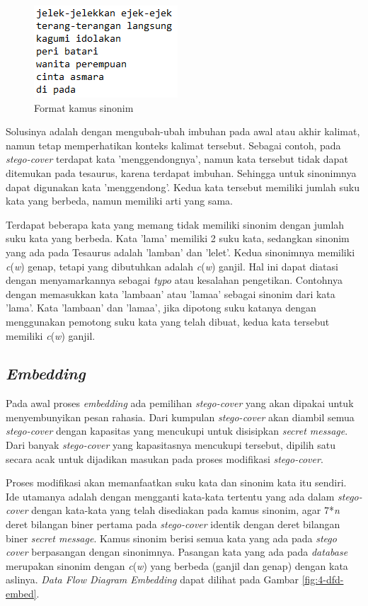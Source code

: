 \begin{figure}[H]
	\centering
	\includegraphics[scale=0.8]{Gambar/format-kamus}
	\caption{Format kamus sinonim} 
	\label{fig:6-format-kamus}
\end{figure}

Solusinya adalah dengan mengubah-ubah imbuhan pada awal atau akhir kalimat, namun tetap memperhatikan konteks kalimat tersebut. Sebagai contoh, pada \textit{stego-cover} terdapat kata 'menggendongnya', namun kata tersebut tidak dapat ditemukan pada tesaurus, karena terdapat imbuhan. Sehingga untuk sinonimnya dapat digunakan kata 'menggendong'. Kedua kata tersebut memiliki jumlah suku kata yang berbeda, namun memiliki arti yang sama.

Terdapat beberapa kata yang memang tidak memiliki sinonim dengan jumlah suku kata yang berbeda. Kata 'lama' memiliki 2 suku kata, sedangkan sinonim yang ada pada Tesaurus adalah 'lamban' dan 'lelet'. Kedua sinonimnya memiliki \textit{c}(\textit{w}) genap, tetapi yang dibutuhkan adalah \textit{c}(\textit{w}) ganjil. Hal ini dapat diatasi dengan menyamarkannya sebagai \textit{typo} atau kesalahan pengetikan. Contohnya dengan memasukkan kata 'lambaan' atau 'lamaa' sebagai sinonim dari kata 'lama'. Kata 'lambaan' dan 'lamaa', jika dipotong suku katanya dengan menggunakan pemotong suku kata yang telah dibuat, kedua kata tersebut memiliki \textit{c}(\textit{w}) ganjil.

\subsection{\textit{Embedding}}
Pada awal proses \textit{embedding} ada pemilihan \textit{stego-cover} yang akan dipakai untuk menyembunyikan pesan rahasia. Dari kumpulan \textit{stego-cover} akan diambil semua \textit{stego-cover} dengan kapasitas yang mencukupi untuk disisipkan \textit{secret message}. Dari banyak \textit{stego-cover} yang kapasitasnya mencukupi tersebut, dipilih satu secara acak untuk dijadikan masukan pada proses modifikasi \textit{stego-cover}.

Proses modifikasi akan memanfaatkan suku kata dan sinonim kata itu sendiri. Ide utamanya adalah dengan mengganti kata-kata tertentu yang ada dalam \textit{stego-cover} dengan kata-kata yang telah disediakan pada kamus sinonim, agar 7*\textit{n} deret bilangan biner pertama pada \textit{stego-cover} identik dengan deret bilangan biner \textit{secret message}. Kamus sinonim berisi semua kata yang ada pada \textit{stego cover} berpasangan dengan sinonimnya. Pasangan kata yang ada pada \textit{database} merupakan sinonim dengan \textit{c}(\textit{w}) yang berbeda (ganjil dan genap) dengan kata aslinya. \textit{Data Flow Diagram Embedding} dapat dilihat pada Gambar \ref{fig:4-dfd-embed}.

